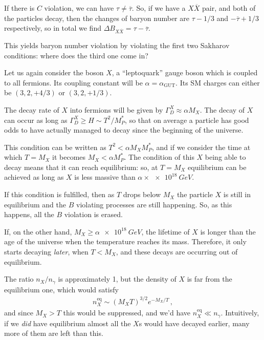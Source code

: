 \documentclass[main.tex]{subfiles}
\begin{document}
If there is \(C\) violation, we can have \(\tau \neq \overline{\tau}\). 
So, if we have a \(X \overline{X}\) pair, and both of the particles decay, then the changes of baryon number are \( \tau - 1/3\) and \(- \overline{\tau} + 1/3\) respectively, so in total we find \(\Delta B_{X \overline{X}} = \tau - \overline{\tau}\).

This yields baryon number violation by violating the first two Sakharov conditions: where does the third one come in? 

Let us again consider the boson \(X\), a ``leptoquark'' gauge boson which is coupled to all fermions. Its coupling constant will be \(\alpha = \alpha _{\text{GUT}}\). 
Its SM charges can either be \((3, 2, +4/3)\) or \((3,2, + 1/3)\). 

The decay rate of \(X\) into fermions will be given by \(\Gamma^{X}_{D} \approx \alpha M_X\). 
The decay of \(X\) can occur as long as \(\Gamma^{X}_{D} \geq H \sim
 T^2 / M_P^{*}\), so that on average a particle has good odds to have actually managed to decay since the beginning of the universe. 
 
This condition can be written as \(T^2< \alpha M_X M^{*}_{P}\), and if we consider the time at which \(T = M_X\) it becomes \(M_X < \alpha M_P^{*}\).
The condition of this \(X\) being able to decay means that it can reach equilibrium: so, at \(T = M_X\) equilibrium can be achieved as long as \(X\) is less massive than \(\alpha \times \SI{e18}{GeV}\). 

If this condition is fulfilled, then as \(T\) drops below \(M_X\) the particle \(X\) is still in equilibrium and the \(B\) violating processes are still happening. So, as this happens, all the \(B\) violation is erased. 

If, on the other hand, \(M_X \geq \alpha \SI{e18}{GeV}\), the lifetime of \(X\) is longer than the age of the universe when the temperature reaches its mass. 
Therefore, it only starts decaying \emph{later}, when \(T < M_X\), and these decays are occurring out of equilibrium. 

The ratio \(n_X / n_\gamma \) is approximately 1, but the density of \(X\) is far from the equilibrium one, which would satisfy 
%
\begin{align}
n_X^{\text{eq}} \sim (M_X T)^{3/2} e^{-M_X / T} 
\,,
\end{align}
%
and since \(M_X > T\) this would be suppressed, and we'd have \(n_X^{\text{eq}} \ll n_\gamma \).
Intuitively, if we \emph{did} have equilibrium almost all the \(X\)s would have decayed earlier, many more of them are left than this. 
\end{document}
